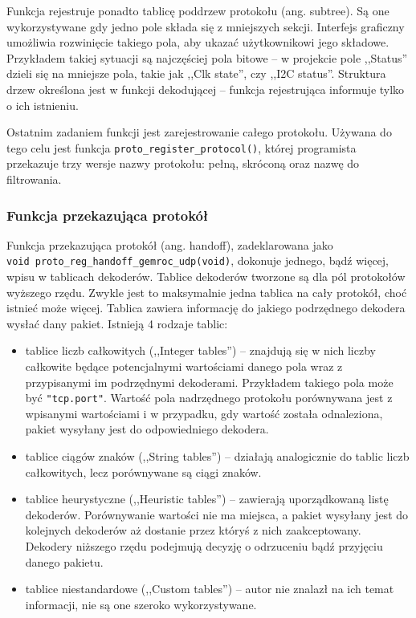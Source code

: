 \documentclass[a4paper, 11pt, twoside, openright]{article}
\begin{document}
	Funkcja rejestruje ponadto tablicę poddrzew protokołu (ang. subtree). Są one wykorzystywane
	gdy jedno pole składa się z mniejszych sekcji. Interfejs graficzny umożliwia rozwinięcie takiego pola, aby ukazać użytkownikowi jego składowe.
	Przykładem takiej sytuacji są najczęściej pola bitowe -- w projekcie pole ,,Status'' dzieli się na mniejsze pola, takie jak
	,,Clk state'', czy ,,I2C status''. Struktura drzew określona jest w funkcji dekodującej --
	funkcja rejestrująca informuje tylko o ich istnieniu.

	Ostatnim zadaniem funkcji jest zarejestrowanie całego protokołu. Używana do tego celu jest funkcja \texttt{proto\_register\_protocol()},
	której programista przekazuje trzy wersje nazwy protokołu: pełną, skróconą oraz nazwę do filtrowania.

	\subsubsection{Funkcja przekazująca protokół}

	\indent\par
	Funkcja przekazująca protokół (ang. handoff), zadeklarowana jako \\ \texttt{void proto\_reg\_handoff\_gemroc\_udp(void)}, dokonuje jednego, bądź więcej, wpisu w tablicach
	dekoderów.
	Tablice dekoderów tworzone są dla pól protokołów wyższego rzędu. Zwykle jest to maksymalnie jedna tablica na cały protokół, choć istnieć może więcej.
	Tablica zawiera informację do jakiego podrzędnego dekodera wysłać dany pakiet.
	Istnieją 4 rodzaje tablic:
	\begin{itemize}
		\item tablice liczb całkowitych (,,Integer tables'') -- znajdują się w nich liczby całkowite będące potencjalnymi wartościami danego pola
			wraz z przypisanymi im podrzędnymi dekoderami. Przykładem takiego pola może być \texttt{"tcp.port"}. Wartość pola nadrzędnego protokołu
			porównywana jest z wpisanymi wartościami i w przypadku, gdy wartość została odnaleziona, pakiet wysyłany jest do odpowiedniego dekodera.
		\item tablice ciągów znaków (,,String tables'') -- działają analogicznie do tablic liczb całkowitych, lecz porównywane są ciągi znaków.
		\item tablice heurystyczne (,,Heuristic tables'') -- zawierają uporządkowaną listę dekoderów. Porównywanie wartości nie ma miejsca, a pakiet
			wysyłany jest do kolejnych dekoderów aż dostanie przez któryś z nich zaakceptowany. Dekodery niższego rzędu podejmują decyzję o odrzuceniu
			bądź przyjęciu danego pakietu.
		\item tablice niestandardowe (,,Custom tables'') -- autor nie znalazł na ich temat informacji, nie są one szeroko wykorzystywane.
	\end{itemize}
\end{document}
